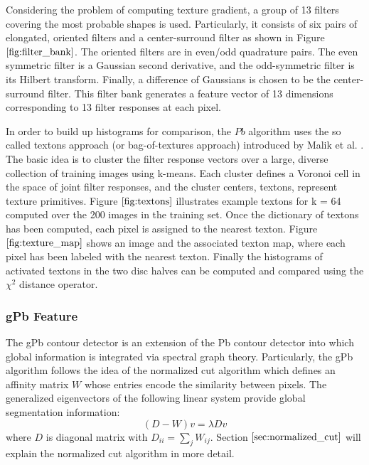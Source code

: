 \documentclass{SMBV12}
\begin{document}
Considering the problem of computing texture gradient, a group of 13 filters covering the most probable shapes is used. Particularly, it consists of six pairs of elongated, oriented filters and a center-surround filter as shown in Figure $\ref{fig:filter_bank}$. The oriented filters are in even/odd quadrature pairs. The even symmetric filter is a Gaussian second derivative, and the odd-symmetric filter is its Hilbert transform. Finally, a difference of Gaussians is chosen to be the center-surround filter. This filter bank generates a feature vector of 13 dimensions corresponding to 13 filter responses at each pixel.

In order to build up histograms for comparison, the $Pb$ algorithm uses the so called textons approach (or bag-of-textures approach) introduced by Malik et al. \cite{malik2001contour}. The basic idea is to cluster the filter response vectors over a large, diverse collection of training images using k-means. Each cluster defines a Voronoi cell in the space of joint filter responses, and the cluster centers, textons, represent texture primitives. Figure $\ref{fig:textons}$ illustrates example textons for k = 64 computed over the 200 images in the training set. Once the dictionary of textons has been computed, each pixel is assigned to the nearest texton. Figure $\ref{fig:texture_map}$ shows an image and the associated texton map, where each pixel has been labeled with the nearest texton. Finally the histograms of activated textons in the two disc halves can be computed and compared using the $\chi^2$ distance operator.

\subsubsection{gPb Feature}

The gPb contour detector \cite{maire2008using} is an extension of the Pb contour detector into which global information is integrated via spectral graph theory. Particularly, the gPb algorithm follows the idea of the normalized cut algorithm which defines an affinity matrix $W$ whose entries encode the similarity between pixels. The generalized eigenvectors of the following linear system provide global segmentation information:
\begin{equation}
(D-W)v = \lambda D v
\label{eq:ncut}
\end{equation}
where $D$ is diagonal matrix with $D_{ii} = \sum_j W_{ij}$.
Section $\ref{sec:normalized_cut}$ will explain the normalized cut algorithm in more detail.
\end{document}
